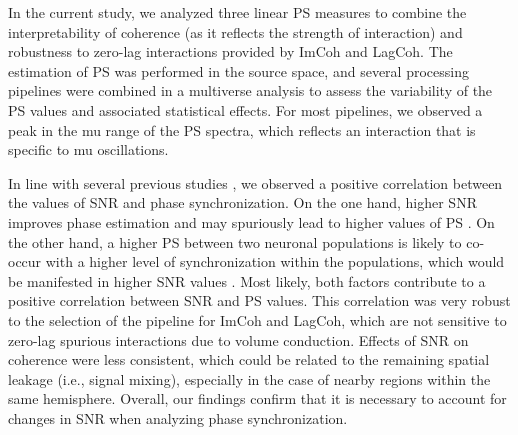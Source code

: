 In the current study, we analyzed three linear PS measures to combine the interpretability of coherence (as it reflects the strength of interaction) and robustness to zero-lag interactions provided by ImCoh and LagCoh. The estimation of PS was performed in the source space, and several processing pipelines were combined in a multiverse analysis to assess the variability of the PS values and associated statistical effects. For most pipelines, we observed a peak in the mu range of the PS spectra, which reflects an interaction that is specific to mu oscillations.

\medskip

In line with several previous studies \citep{Bayraktaroglu2013, Vidaurre2020}, we observed a positive correlation between the values of SNR and phase synchronization. On the one hand, higher SNR improves phase estimation and may spuriously lead to higher values of PS \citep{MuthukumaraswamySingh2011}. On the other hand, a higher PS between two neuronal populations is likely to co-occur with a higher level of synchronization within the populations, which would be manifested in higher SNR values \citep{Schneider2021}. Most likely, both factors contribute to a positive correlation between SNR and PS values. This correlation was very robust to the selection of the pipeline for ImCoh and LagCoh, which are not sensitive to zero-lag spurious interactions due to volume conduction. Effects of SNR on coherence were less consistent, which could be related to the remaining spatial leakage (i.e., signal mixing), especially in the case of nearby regions within the same hemisphere. Overall, our findings confirm that it is necessary to account for changes in SNR when analyzing phase synchronization.

\medskip

